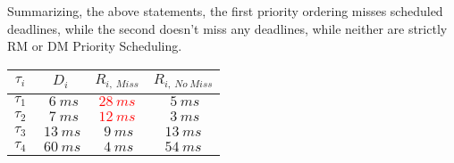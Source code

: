 \documentclass[oneside,a4paper]{article}
\begin{document}
Summarizing, the above statements, the first priority ordering misses scheduled deadlines, while the second doesn't miss any deadlines, while neither are strictly RM or DM Priority Scheduling.
\begin{center}
\begin{tabular}{| c | c | c | c |}
\hline
\textbf{$\tau_i$} & \textbf{$D_i$} &    \textbf{$R_{i,\ Miss}$} & \textbf{$R_{i,\ No\ Miss}$}\\
\hline
$\tau_1$ &  $\ \ 6\ ms$ & \textcolor{red}{$28 \ ms$} & $\ 5 \ ms$ \\
$\tau_2$ &  $\ \ 7\ ms$ & \textcolor{red}{$12 \ ms$} & $\ 3 \ ms$ \\
$\tau_3$ &  $\ 13\ ms$ & $\ 9 \ ms$ & $13 \ ms$ \\
$\tau_4$ &  $\ 60\ ms$ & $\ 4 \ ms$ & $54 \ ms$ \\
\hline
\end{tabular}
\end{center}\par
\pagebreak
\end{document}
